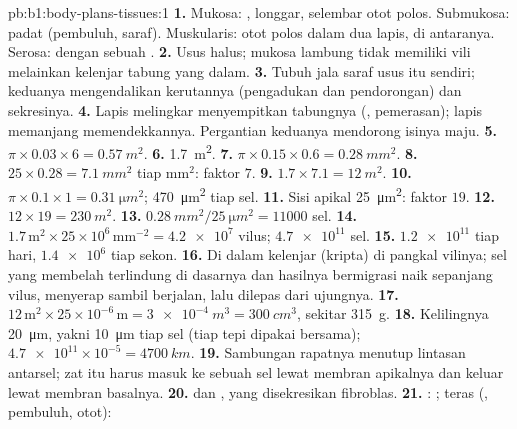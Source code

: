 \begin{solution}{pb:b1:body-plans-tissues:1}
\textbf{1.} Mukosa: ,  longgar, selembar otot polos.
Submukosa:  padat (pembuluh, saraf). Muskularis: otot polos
dalam dua lapis,  di antaranya. Serosa: 
dengan sebuah .
\textbf{2.} Usus halus; mukosa lambung tidak memiliki vili melainkan
kelenjar tabung yang dalam.
\textbf{3.} Tubuh  jala saraf usus itu sendiri; keduanya
mengendalikan kerutannya (pengadukan dan pendorongan) dan sekresinya.
\textbf{4.} Lapis melingkar menyempitkan tabungnya (,
pemerasan); lapis memanjang memendekkannya. Pergantian keduanya
mendorong isinya maju.
\textbf{5.} $\pi\times 0.03\times 6 = \qty{0.57}{m^2}$.
\textbf{6.} \qty{1.7}{m^2}.
\textbf{7.} $\pi\times 0.15\times 0.6 = \qty{0.28}{mm^2}$.
\textbf{8.} $25\times 0.28 = \qty{7.1}{mm^2}$ tiap mm$^2$: faktor $7$.
\textbf{9.} $1.7\times 7.1 = \qty{12}{m^2}$.
\textbf{10.} $\pi\times 0.1\times 1 = \qty{0.31}{\micro m^2}$;
\qty{470}{\micro m^2} tiap sel.
\textbf{11.} Sisi apikal \qty{25}{\micro m^2}: faktor $19$.
\textbf{12.} $12\times 19 = \qty{230}{m^2}$.
\textbf{13.} $\qty{0.28}{mm^2}/\qty{25}{\micro m^2} = \num{11000}$ sel.
\textbf{14.} $1.7\,\mathrm{m^2}\times 25\times 10^6\,\mathrm{mm^{-2}} =
\num{4.2e7}$ vilus; $\num{4.7e11}$ sel.
\textbf{15.} $\num{1.2e11}$ tiap hari, $\num{1.4e6}$ tiap sekon.
\textbf{16.} Di dalam kelenjar (kripta) di pangkal vilinya; sel yang
membelah terlindung di dasarnya dan hasilnya bermigrasi naik sepanjang
vilus, menyerap sambil berjalan, lalu dilepas dari ujungnya.
\textbf{17.} $12\,\mathrm{m^2}\times 25\times 10^{-6}\,\mathrm{m} =
\qty{3e-4}{m^3} = \qty{300}{cm^3}$, sekitar \qty{315}{g}.
\textbf{18.} Kelilingnya \qty{20}{\micro m}, yakni \qty{10}{\micro m}
tiap sel (tiap tepi dipakai bersama);
$\num{4.7e11}\times 10^{-5} = \qty{4700}{km}$.
\textbf{19.} Sambungan rapatnya menutup lintasan antarsel; zat itu harus
masuk ke sebuah sel lewat membran apikalnya dan keluar lewat membran
basalnya.
\textbf{20.}  dan , yang disekresikan fibroblas.
\textbf{21.} : ; teras (, pembuluh, otot):

\end{solution}

